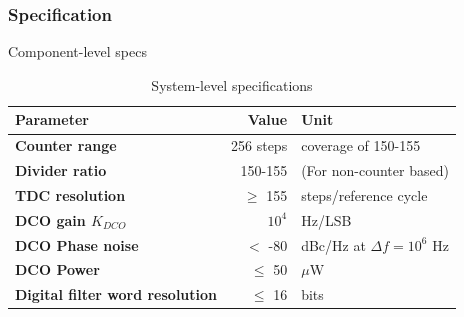 \documentclass[t, screen, aspectratio=43]{beamer}
\begin{document}
\begin{frame}
	\frametitle{Specification\color{black}}
	\begin{block}{Component-level specs}
		\scriptsize
	\begin{table}[h!]
		\centering
		\def\arraystretch{1.5}		
		\setlength\arrayrulewidth{0.75pt}
		\setlength{\tabcolsep}{1em} %
		\begin{tabular}{|l|r|l|}
			\hline 
			\rule[-1ex]{0pt}{2.5ex} \cellcolor{gray!40}\textbf{Parameter} & \cellcolor{gray!40}\textbf{Value} & \cellcolor{gray!40}\textbf{Unit }\\ 
			\hline 
			\rule[-1ex]{0pt}{2.5ex} \textbf{Counter range}  & 256 steps & coverage of 150-155 \\ 
			\hline 
			\rule[-1ex]{0pt}{2.5ex} \textbf{Divider ratio} & 150-155  & (For non-counter based)\\ 
			\hline 
			\rule[-1ex]{0pt}{2.5ex} \textbf{TDC resolution} &$\geq$ 155  & steps/reference cycle\\ 
			\hline 
			\rule[-1ex]{0pt}{2.5ex} \textbf{DCO gain $K_{DCO}$} & $10^4$ & Hz/LSB \\ 
			\hline 
			\rule[-1ex]{0pt}{2.5ex} \textbf{DCO Phase noise} &$<$ -80 & dBc/Hz at $\Delta f=10^6$ Hz \\ 
			\hline 
			\rule[-1ex]{0pt}{2.5ex} \textbf{DCO Power} & $\leq$ 50 & $\mu$W \\ 
			\hline 
			\rule[-1ex]{0pt}{2.5ex} \textbf{Digital filter word resolution} & $\leq$ 16 & bits \\ 
			\hline 
		\end{tabular} 
		\caption{System-level specifications}
		\label{design_specs}
	\end{table}   
	\end{block}    
\end{frame}

\end{document}

